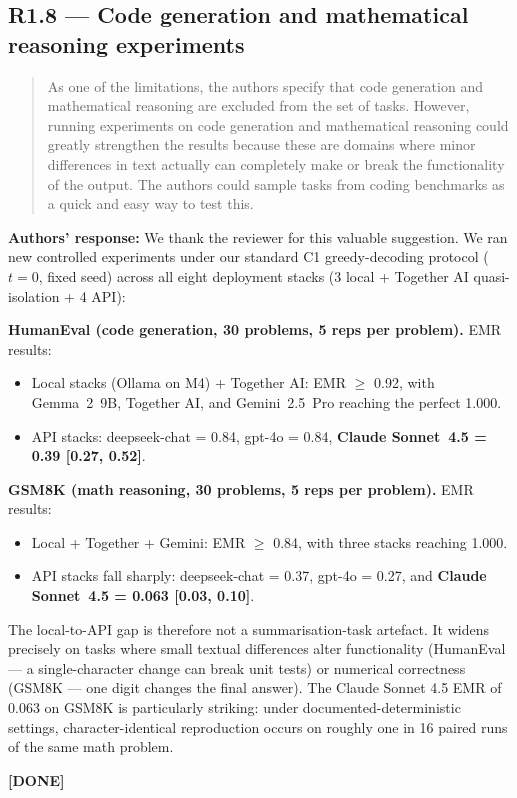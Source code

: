 \documentclass[11pt,a4paper]{article}
\newenvironment{revquote}{%
  \begin{quote}\small\itshape\color{revgray}
}{%
  \end{quote}
}
\newcommand{\response}[1]{\par\noindent\textbf{\color{revgreen}Authors' response:} #1\par}
\newcommand{\done}{\color{revgreen}\textbf{[DONE]}}
\begin{document}
\subsection*{R1.8 --- Code generation and mathematical reasoning experiments}

\begin{revquote}
As one of the limitations, the authors specify that code generation and mathematical reasoning are excluded from the set of tasks. However, running experiments on code generation and mathematical reasoning could greatly strengthen the results because these are domains where minor differences in text actually can completely make or break the functionality of the output. The authors could sample tasks from coding benchmarks as a quick and easy way to test this.
\end{revquote}

\response{We thank the reviewer for this valuable suggestion. We ran new controlled experiments under our standard C1 greedy-decoding protocol ($t{=}0$, fixed seed) across all eight deployment stacks (3 local + Together AI quasi-isolation + 4 API):

\textbf{HumanEval (code generation, 30 problems, 5 reps per problem).} EMR results:
\begin{itemize}[leftmargin=*]
  \item Local stacks (Ollama on M4) + Together AI: EMR $\geq$ 0.92, with Gemma~2~9B, Together AI, and Gemini~2.5~Pro reaching the perfect 1.000.
  \item API stacks: deepseek-chat = 0.84, gpt-4o = 0.84, \textbf{Claude Sonnet~4.5 = 0.39 [0.27, 0.52]}.
\end{itemize}

\textbf{GSM8K (math reasoning, 30 problems, 5 reps per problem).} EMR results:
\begin{itemize}[leftmargin=*]
  \item Local + Together + Gemini: EMR $\geq$ 0.84, with three stacks reaching 1.000.
  \item API stacks fall sharply: deepseek-chat = 0.37, gpt-4o = 0.27, and \textbf{Claude Sonnet~4.5 = 0.063 [0.03, 0.10]}.
\end{itemize}

The local-to-API gap is therefore not a summarisation-task artefact. It widens precisely on tasks where small textual differences alter functionality (HumanEval --- a single-character change can break unit tests) or numerical correctness (GSM8K --- one digit changes the final answer). The Claude Sonnet 4.5 EMR of 0.063 on GSM8K is particularly striking: under documented-deterministic settings, character-identical reproduction occurs on roughly one in 16 paired runs of the same math problem.} \done
\end{document}
